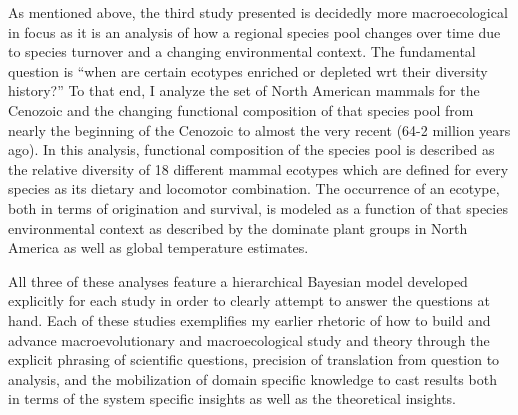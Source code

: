As mentioned above, the third study presented is decidedly more macroecological in focus as it is an analysis of how a regional species pool changes over time due to species turnover and a changing environmental context. The fundamental question is ``when are certain ecotypes enriched or depleted wrt their diversity history?'' To that end, I analyze the set of North American mammals for the Cenozoic and the changing functional composition of that species pool from nearly the beginning of the Cenozoic to almost the very recent (64-2 million years ago). In this analysis, functional composition of the species pool is described as the relative diversity of 18 different mammal ecotypes which are defined for every species as its dietary and locomotor combination. The occurrence of an ecotype, both in terms of origination and survival, is modeled as a function of that species environmental context as described by the dominate plant groups in North America as well as global temperature estimates.

All three of these analyses feature a hierarchical Bayesian model developed explicitly for each study in order to clearly attempt to answer the questions at hand. Each of these studies exemplifies my earlier rhetoric of how to build and advance macroevolutionary and macroecological study and theory through the explicit phrasing of scientific questions, precision of translation from question to analysis, and the mobilization of domain specific knowledge to cast results both in terms of the system specific insights as well as the theoretical insights.
